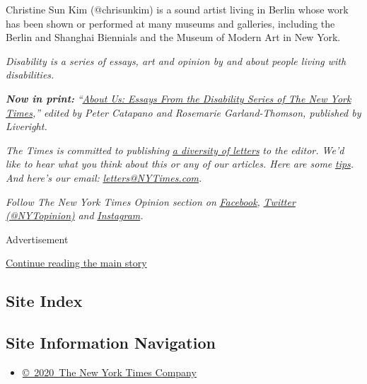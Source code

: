 Christine Sun Kim (@chrisunkim) is a sound artist living in Berlin whose
work has been shown or performed at many museums and galleries,
including the Berlin and Shanghai Biennials and the Museum of Modern Art
in New York.

\emph{Disability is a series of essays, art and opinion by and about
people living with disabilities.}

\emph{\textbf{Now in print:}}
\emph{``}\href{https://www.aboutusbook.com/}{\emph{About Us: Essays From
the Disability Series of The New York Times}}\emph{,'' edited by Peter
Catapano and Rosemarie Garland-Thomson, published by Liveright.}

\emph{The Times is committed to publishing}
\href{https://www.nytimes3xbfgragh.onion/2019/01/31/opinion/letters/letters-to-editor-new-york-times-women.html}{\emph{a
diversity of letters}} \emph{to the editor. We'd like to hear what you
think about this or any of our articles. Here are some}
\href{https://help.nytimes3xbfgragh.onion/hc/en-us/articles/115014925288-How-to-submit-a-letter-to-the-editor}{\emph{tips}}\emph{.
And here's our email:}
\href{mailto:letters@NYTimes.com}{\emph{letters@NYTimes.com}}\emph{.}

\emph{Follow The New York Times Opinion section on}
\href{https://www.facebookcorewwwi.onion/nytopinion}{\emph{Facebook}}\emph{,}
\href{http://twitter.com/NYTOpinion}{\emph{Twitter (@NYTopinion)}}
\emph{and}
\href{https://www.instagram.com/nytopinion/}{\emph{Instagram}}\emph{.}

Advertisement

\protect\hyperlink{after-bottom}{Continue reading the main story}

\hypertarget{site-index}{%
\subsection{Site Index}\label{site-index}}

\hypertarget{site-information-navigation}{%
\subsection{Site Information
Navigation}\label{site-information-navigation}}

\begin{itemize}
\tightlist
\item
  \href{https://help.nytimes3xbfgragh.onion/hc/en-us/articles/115014792127-Copyright-notice}{©~2020~The
  New York Times Company}
\end{itemize}

